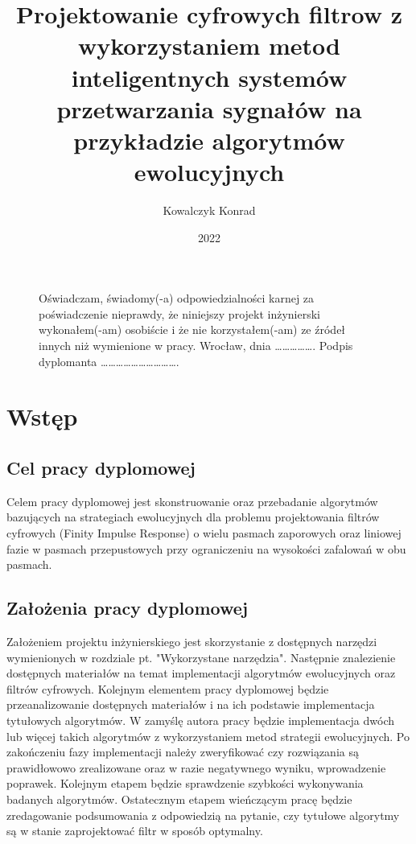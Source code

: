 \documentclass[eng, pl, oneside, openright, final, openbib]{mgr}\DeclareUnicodeCharacter{0301}{\'{e}}
\author{Kowalczyk Konrad}
\title{Projektowanie cyfrowych filtrow z wykorzystaniem metod inteligentnych systemów przetwarzania sygnałów na przykładzie algorytmów ewolucyjnych}
\date{2022}
\begin{document}
\maketitle


\begin{figure}[b]
Oświadczam, świadomy(-a) odpowiedzialności karnej za poświadczenie
nieprawdy, że niniejszy projekt inżynierski wykonałem(-am) osobiście i że nie
korzystałem(-am) ze źródeł innych niż wymienione w pracy.
\newline
Wrocław, dnia ……………. Podpis dyplomanta ………………………….
\end{figure}

\tableofcontents


\chapter{Wstęp}
\section{Cel pracy dyplomowej}
Celem pracy dyplomowej jest skonstruowanie oraz przebadanie algorytmów bazujących na strategiach ewolucyjnych dla problemu projektowania filtrów cyfrowych (Finity Impulse Response) o wielu pasmach zaporowych oraz liniowej fazie w pasmach przepustowych przy ograniczeniu na wysokości zafalowań w obu pasmach.  
  
\section{Założenia pracy dyplomowej}
Założeniem projektu inżynierskiego jest skorzystanie z dostępnych narzędzi wymienionych w rozdziale pt. "Wykorzystane narzędzia". Następnie znalezienie dostępnych materiałów na temat implementacji algorytmów ewolucyjnych oraz filtrów cyfrowych. Kolejnym elementem pracy dyplomowej będzie przeanalizowanie dostępnych materiałów i na ich podstawie implementacja tytułowych algorytmów. W zamyślę autora pracy będzie implementacja dwóch lub więcej takich algorytmów z wykorzystaniem metod  strategii ewolucyjnych. Po zakończeniu fazy implementacji należy zweryfikować czy rozwiązania są prawidłowowo zrealizowane oraz w razie negatywnego wyniku, wprowadzenie poprawek. Kolejnym etapem będzie sprawdzenie szybkości wykonywania badanych algorytmów. Ostatecznym etapem wieńczącym pracę będzie zredagowanie podsumowania z odpowiedzią na pytanie, czy tytułowe algorytmy są w stanie zaprojektować filtr w sposób optymalny.
 
\end{document}
